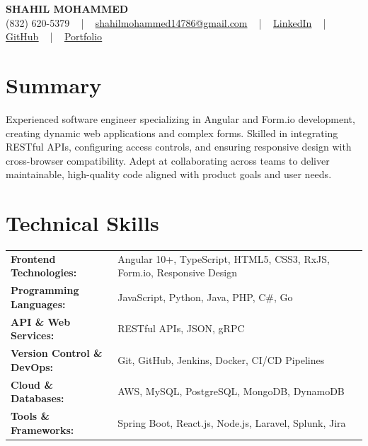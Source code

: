 \documentclass[letterpaper,11pt]{article}
\begin{document}
\begin{center}
    {\fontsize{14pt}{12pt}\selectfont \textbf{\MakeUppercase{Shahil Mohammed}}}\\ \vspace{2pt}
    \fontsize{10pt}{12pt}\selectfont (832) 620-5379 ~ | ~ \href{mailto:shahilmohammed14786@gmail.com}{shahilmohammed14786@gmail.com} ~ | ~  
    \href{https://www.linkedin.com/in/shahil-mohammed-9652931a1/}{\color{blue}\underline{LinkedIn}}  ~ | ~ 
    \href{https://github.com/freakbeast14}{\color{blue}\underline{GitHub}} ~ | ~ 
    \href{https://shahil-mohammed.netlify.app/}{\color{blue}\underline{Portfolio}}
    \vspace{-8pt}
\end{center}

\section{Summary}
\fontsize{9pt}{10pt}\selectfont
Experienced software engineer specializing in Angular and Form.io development, creating dynamic web applications and complex forms. Skilled in integrating RESTful APIs, configuring access controls, and ensuring responsive design with cross-browser compatibility. Adept at collaborating across teams to deliver maintainable, high-quality code aligned with product goals and user needs.
 \vspace{-5pt}
 
\section{Technical Skills}
        \vspace{-14pt}
        \begin{table}[h]
            \fontsize{9pt}{10pt}\selectfont
            \begin{tabular}{p{0.3\linewidth} p{0.7\linewidth}}
                \textbf{Frontend Technologies:} & Angular 10+, TypeScript, HTML5, CSS3, RxJS, Form.io, Responsive Design \\
                \textbf{Programming Languages:} & JavaScript, Python, Java, PHP, C\#, Go \\
                \textbf{API \& Web Services:} & RESTful APIs, JSON, gRPC \\
                \textbf{Version Control \& DevOps:} & Git, GitHub, Jenkins, Docker, CI/CD Pipelines \\
                \textbf{Cloud \& Databases:} & AWS, MySQL, PostgreSQL, MongoDB, DynamoDB \\
                \textbf{Tools \& Frameworks:} & Spring Boot, React.js, Node.js, Laravel, Splunk, Jira \\
            \end{tabular}
        \end{table}
 \vspace{-15pt}
 
\end{document}
